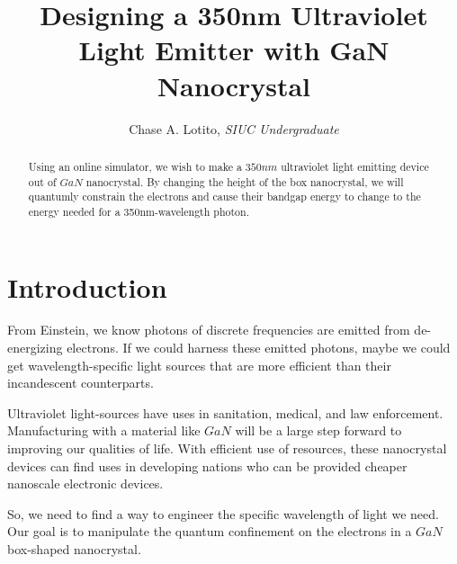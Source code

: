\documentclass{IEEEtran}
\title{Designing a 350nm Ultraviolet Light Emitter with GaN Nanocrystal}
\author{Chase A. Lotito, \textit{SIUC Undergraduate}}
\date{}
\begin{document}

\maketitle %

\begin{abstract}

    Using an online simulator, we wish to make a \(350nm\) ultraviolet light emitting device out of \(GaN\) nanocrystal. By changing the height of the box nanocrystal, we will quantumly constrain the electrons and cause their bandgap energy to change to the energy needed for a 350nm-wavelength photon.   

\end{abstract}

\section{Introduction}

From Einstein, we know photons of discrete frequencies are emitted from de-energizing electrons. If we could harness these emitted photons, maybe we could get wavelength-specific light sources that are more efficient than their incandescent counterparts.

Ultraviolet light-sources have uses in sanitation, medical, and law enforcement. Manufacturing with a material like $GaN$ will be a large step forward to improving our qualities of life. With efficient use of resources, these nanocrystal devices can find uses in developing nations who can be provided cheaper nanoscale electronic devices.

So, we need to find a way to engineer the specific wavelength of light we need. Our goal is to manipulate the quantum confinement on the electrons in a \(GaN\) box-shaped nanocrystal.
\end{document}
